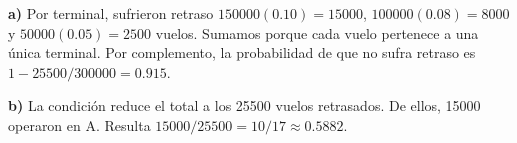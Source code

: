 \textbf{a)} Por terminal, sufrieron retraso
$150000(0.10)=15000$, $100000(0.08)=8000$ y $50000(0.05)=2500$ vuelos.
Sumamos porque cada vuelo pertenece a una única terminal. Por
complemento, la probabilidad de que no sufra retraso es
$1-25500/300000=\boxed{0.915}$.

\textbf{b)} La condición reduce el total a los 25500 vuelos
retrasados. De ellos, 15000 operaron en A. Resulta
$\boxed{15000/25500=10/17\approx0.5882}$.
